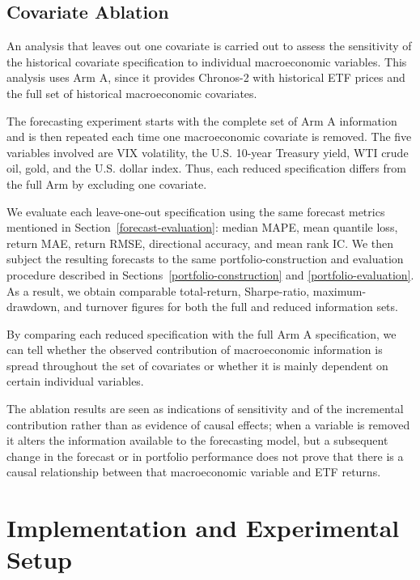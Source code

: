 \documentclass[12pt,a4paper,twoside,openany]{book}
\begin{document}
\section{Covariate Ablation}\label{covariate-ablation}

An analysis that leaves out one covariate is carried out to assess the sensitivity of the historical covariate specification to individual macroeconomic variables. This analysis uses Arm A, since it provides Chronos-2 with historical ETF prices and the full set of historical macroeconomic covariates.

The forecasting experiment starts with the complete set of Arm A information and is then repeated each time one macroeconomic covariate is removed. The five variables involved are VIX volatility, the U.S. 10-year Treasury yield, WTI crude oil, gold, and the U.S. dollar index. Thus, each reduced specification differs from the full Arm by excluding one covariate.

We evaluate each leave-one-out specification using the same forecast metrics mentioned in Section~\ref{forecast-evaluation}: median MAPE, mean quantile loss, return MAE, return RMSE, directional accuracy, and mean rank IC. We then subject the resulting forecasts to the same portfolio-construction and evaluation procedure described in Sections~\ref{portfolio-construction} and \ref{portfolio-evaluation}. As a result, we obtain comparable total-return, Sharpe-ratio, maximum-drawdown, and turnover figures for both the full and reduced information sets.

By comparing each reduced specification with the full Arm A specification, we can tell whether the observed contribution of macroeconomic information is spread throughout the set of covariates or whether it is mainly dependent on certain individual variables.

The ablation results are seen as indications of sensitivity and of the incremental contribution rather than as evidence of causal effects; when a variable is removed it alters the information available to the forecasting model, but a subsequent change in the forecast or in portfolio performance does not prove that there is a causal relationship between that macroeconomic variable and ETF returns.

\chapter{Implementation and Experimental Setup}\label{implementation-and-experimental-setup}
\end{document}
